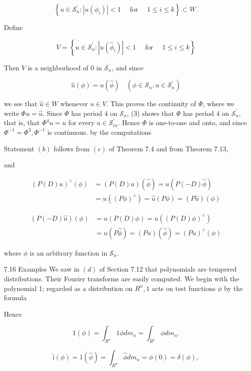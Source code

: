 \documentclass[10pt]{article}
\begin{document}
$$
\left\{u \in \mathscr{S}_{n}^{\prime}:\left|u\left(\phi_{i}\right)\right|<1 \quad \text { for } \quad 1 \leq i \leq k\right\} \subset W .
$$

Define

$$
V=\left\{u \in \mathscr{S}_{n}^{\prime}:\left|u\left(\hat{\phi}_{i}\right)\right|<1 \quad \text { for } \quad 1 \leq i \leq k\right\}
$$

Then $V$ is a neighborhood of 0 in $\mathscr{S}_{n}^{\prime}$, and since

$$
\hat{u}(\phi)=u(\hat{\phi}) \quad\left(\phi \in \mathscr{S}_{n}, u \in \mathscr{S}_{n}^{\prime}\right)
$$

we see that $\hat{u} \in W$ whenever $u \in V$. This proves the continuity of $\Phi$, where we write $\Phi u=\hat{u}$. Since $\Phi$ has period 4 on $\mathscr{S}_{n}$, (3) shows that $\Phi$ has period 4 on $\mathscr{S}_{n}^{\prime}$, that is, that $\Phi^{4} u=u$ for every $u \in \mathscr{S}_{i n}^{\prime}$. Hence $\Phi$ is one-to-one and onto, and since $\Phi^{-1}=\Phi^{3}, \Phi^{-1}$ is continuous.
by the computations

Statement $(b)$ follows from $(c)$ of Theorem 7.4 and from Theorem 7.13,

and

$$
\begin{aligned}
(P(D) u)^{\wedge}(\phi) & =(P(D) u)(\hat{\phi})=u(P(-D) \hat{\phi}) \\
& =u\left((P \phi)^{\wedge}\right)=\hat{u}(P \phi)=(P \hat{u})(\phi)
\end{aligned}
$$

$$
\begin{aligned}
(P(-D) \hat{u})(\phi) & =\hat{u}(P(D) \phi)=u\left((P(D) \phi)^{\wedge}\right) \\
& =u(P \hat{\phi})=(P u)(\hat{\phi})=(P u)^{\wedge}(\phi)
\end{aligned}
$$

where $\phi$ is an arbitrary function in $\mathscr{S}_{n}$.

7.16 Examples We saw in $(d)$ of Section 7.12 that polynomials are tempered distributions. Their Fourier transforms are easily computed. We begin with the polynomial 1; regarded as a distribution on $R^{n}, 1$ acts on test functions $\phi$ by the formula

Hence

$$
1(\phi)=\int_{R^{n}} 1 \phi d m_{n}=\int_{R^{n}} \phi d m_{n} .
$$

$$
\hat{\mathrm{i}}(\phi)=1(\hat{\phi})=\int_{R^{n}} \hat{\phi} d m_{n}=\phi(0)=\delta(\phi),
$$
\end{document}
